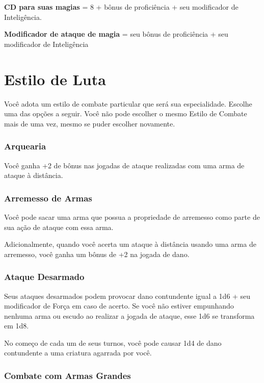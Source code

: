 \documentclass{RPG_Adventure}[2021/10/20]
\begin{document}
\begin{center}
\textbf{CD para suas magias} = 8 + bônus de proficiência + seu modificador de
Inteligência. \nl

\textbf{Modificador de ataque de magia} = seu bônus de proficiência + seu
modificador de Inteligência
\end{center}

\section*{Estilo de Luta}%

Você adota um estilo de combate particular que será sua especialidade. Escolhe
uma das opções a seguir. Você não pode escolher o mesmo Estilo de Combate mais
de uma vez, mesmo se puder escolher novamente.

\subsubsection{Arquearia}%

Você ganha +2 de bônus nas jogadas de ataque realizadas com uma arma de ataque à
distância.

\subsubsection{Arremesso de Armas}%

Você pode sacar uma arma que possua a propriedade de arremesso como parte de sua
ação de ataque com essa arma.

Adicionalmente, quando você acerta um ataque à distância usando uma arma de
arremesso, você ganha um bônus de +2 na jogada de dano.

\subsubsection{Ataque Desarmado}%

Seus ataques desarmados podem provocar dano contundente igual a 1d6 + seu
modificador de Força em caso de acerto. Se você não estiver empunhando nenhuma
arma ou escudo ao realizar a jogada de ataque, esse 1d6 se transforma em 1d8.

No começo de cada um de seus turnos, você pode causar 1d4 de dano contundente a
uma criatura agarrada por você.

\subsubsection{Combate com Armas Grandes}%
\end{document}
